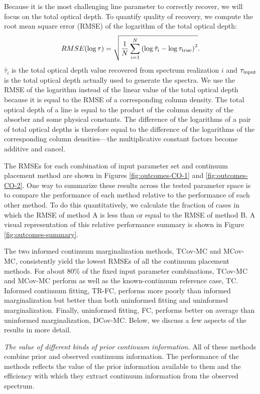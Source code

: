\documentclass[manuscript]{aastex62}
\begin{document}
{Because it is the most challenging line parameter to correctly recover, we will focus on the total optical depth.
To quantify quality of recovery, we compute the root mean square error (RMSE) of the logarithm of the total optical depth:
\begin{equation}
  \label{eqn:RMSE-def}
  RMSE(\log\tau) = \sqrt{
    \frac{1}{N} \sum_{i=1}^{N} \left( \log\hat{\tau}_i - \log\tau_{\rm true} \right)^2
  }.
\end{equation}
$\hat{\tau}_i$ is the total optical depth value recovered from spectrum realization $i$ and $\tau_{\rm input}$ is the total optical depth actually used to generate the spectra.
We use the RMSE of the logarithm instead of the linear value of the total optical depth because it is equal to the RMSE of a corresponding column density.
The total optical depth of a line is equal to the product of the column density of the absorber and some physical constants.
The difference of the logarithms of a pair of total optical depths is therefore equal to the difference of the logarithms of the corresponding column densities---the multiplicative constant factors become additive and cancel.

The RMSEs for each combination of input parameter set and continuum placement method are shown in Figures \ref{fig:outcomes-CO-1} and \ref{fig:outcomes-CO-2}.
One way to summarize these results across the tested parameter space is to compare the performance of each method relative to the performance of each other method.
To do this quantitatively, we calculate the fraction of cases in which the RMSE of method A is less than or equal to the RMSE of method B.
A visual representation of this relative performance summary is shown in Figure \ref{fig:outcomes-summary}.

The two informed continuum marginalization methods, TCov-MC and MCov-MC, consistently yield the lowest RMSEs of all the continuum placement methods.
For about 80\% of the fixed input parameter combinations, TCov-MC and MCov-MC perform as well as the known-continuum reference case, TC.
Informed continuum fitting, TR-FC, performs more poorly than informed marginalization but better than both uninformed fitting and uninformed marginalization.
Finally, uninformed fitting, FC, performs better on average than uninformed marginalization, DCov-MC.
Below, we discuss a few aspects of the results in more detail.

\emph{The value of different kinds of prior continuum information.}
All of these methods combine prior and observed continuum information.
The performance of the methods reflects the value of the prior information available to them and the efficiency with which they extract continuum information from the observed spectrum.

}
\end{document}
